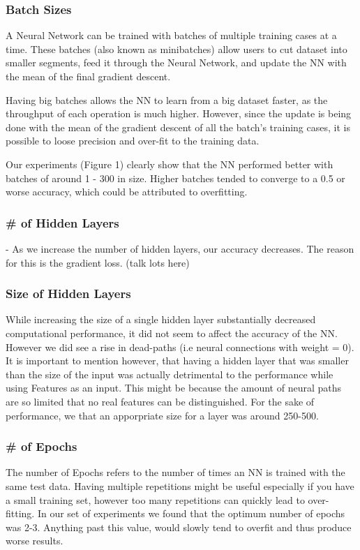 \documentclass[11pt,onecolumn]{article} %
\begin{document}
\subsubsection{Batch Sizes}
A Neural Network can be trained with batches of multiple training cases at a time. These batches (also known as minibatches) allow users to cut dataset into smaller segments, feed it through the Neural Network, and update the NN with the mean of the final gradient descent.
\par Having big batches allows the NN to learn from a big dataset faster, as the throughput of each operation is much higher. However, since the update is being done with the mean of the gradient descent of all the batch's training cases, it is possible to loose precision and over-fit to the training data.
\par Our experiments (Figure 1) clearly show that the NN performed better with batches of around 1 - 300 in size. Higher batches tended to converge to a 0.5 or worse accuracy, which could be attributed to overfitting. 


\subsubsection{\# of Hidden Layers}
- As we increase the number of hidden layers, our accuracy decreases. The reason for this is the gradient loss. (talk lots here)

\subsubsection{Size of Hidden Layers}
While increasing the size of a single hidden layer substantially decreased computational performance, it did not seem to affect the accuracy of the NN. However we did see a rise in dead-paths (i.e neural connections with weight = 0). It is important to mention however, that having a hidden layer that was smaller than the size of the input was actually detrimental to the performance while using Features as an input. This might be because the amount of neural paths are so limited that no real features can be distinguished. For the sake of performance, we that an apporpriate size for a layer was around 250-500.

\subsubsection{\# of Epochs}
The number of Epochs refers to the number of times an NN is trained with the same test data. Having multiple repetitions might be useful especially if you have a small training set, however too many repetitions can quickly lead to over-fitting. In our set of experiments we found that the optimum number of epochs was 2-3. Anything past this value, would slowly tend to overfit and thus produce worse results.
\end{document}
